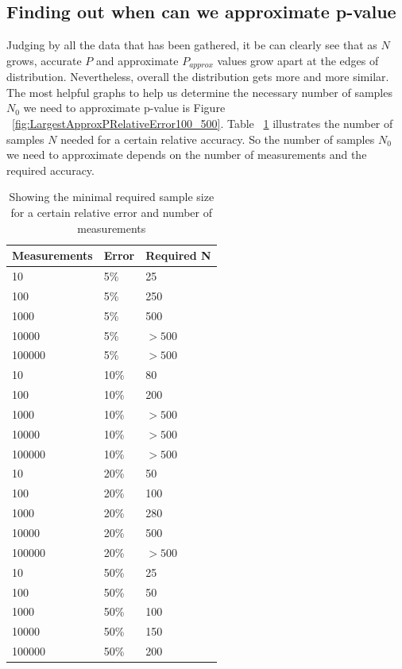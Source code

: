 \documentclass[12pt]{article}
\begin{document}
{\subsection{Finding out when can we approximate p-value}
Judging by all the data that has been gathered, it be can clearly see that as $N$ grows, accurate $P$ and approximate $P_{approx}$ values grow apart at the edges of distribution. Nevertheless, overall the distribution gets more and more similar. The most helpful graphs to help us determine the necessary number of samples $N_0$ we need to approximate p-value is Figure ~\ref{fig:LargestApproxPRelativeError100_500}. Table ~\ref{table:requiredN} illustrates the number of samples $N$ needed for a certain relative accuracy. So the number of samples $N_0$ we need to approximate depends on the number of measurements and the required accuracy.

\begin{table}[H]
	\begin{center}
		\caption{Showing the minimal required sample size for a certain relative error and number of measurements}
	    \begin{tabular}{| l | l | l |}
	    \hline
		Measurements & Error & Required N \\
		\hline
		10 & 5\% & 25 \\
    \hline
		100 & 5\% & 250 \\
    \hline
		1000 & 5\% & 500 \\
    \hline
		10000 & 5\% & $>500$ \\
    \hline
		100000 & 5\% & $> 500$ \\
    \hline
		\hline
		10  & 10\% & 80 \\
    \hline
		100 & 10\% & 200 \\
    \hline
		1000 & 10\% & $>500$ \\
    \hline
		10000 & 10\% & $>500$ \\
    \hline
		100000  & 10\% & $>500$ \\
		\hline
    \hline
		10  & 20\% & 50 \\
    \hline
		100 & 20\% & 100 \\
    \hline
		1000  & 20\% & 280 \\
    \hline
		10000  & 20\% & 500 \\
    \hline
		100000  & 20\% & $>500$ \\
    \hline
    \hline
		10  & 50\% &  25 \\
    \hline
		100 & 50\% & 50 \\
    \hline
		1000 & 50\% & 100 \\
    \hline
		10000 & 50\% & 150 \\
    \hline
		100000 & 50\% & 200 \\
		\hline
		\end{tabular}
		\label{table:requiredN}
	\end{center}
\end{table}

}
\end{document}

